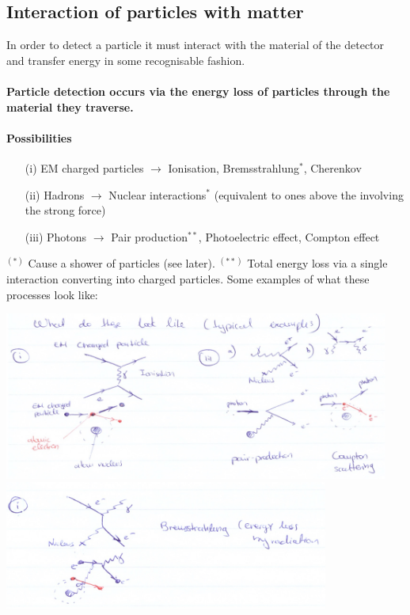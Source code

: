 \subsection{Interaction of particles with matter}
\label{sec:interaction_particle_matter}
In order to detect a particle it must interact with the material of the detector and transfer energy in some recognisable fashion.
\paragraph{Particle detection occurs via the energy loss of particles through the material they traverse.}

\paragraph{Possibilities}
\begin{itemize}
\item[(i)] EM charged particles $\rightarrow$ Ionisation, Bremsstrahlung$^*$, Cherenkov
\item[(ii)] Hadrons $\rightarrow$ Nuclear interactions$^*$ (equivalent to ones above the involving the strong force)
\item[(iii)] Photons $\rightarrow$ Pair production$^{**}$, Photoelectric effect, Compton effect
\end{itemize}
$^{(*)}$ Cause a shower of particles (see later).\newline
$^{(**)}$ Total energy loss via a single interaction converting into charged particles.\newline
Some examples of what these processes look like:

\begin{center}
\includegraphics[width=0.95\textwidth]{fig/strongforce/matterinteractions/interactions1.jpg}\newline
\includegraphics[width=0.8\textwidth]{fig/strongforce/matterinteractions/interactions2.jpg}
\end{center}


